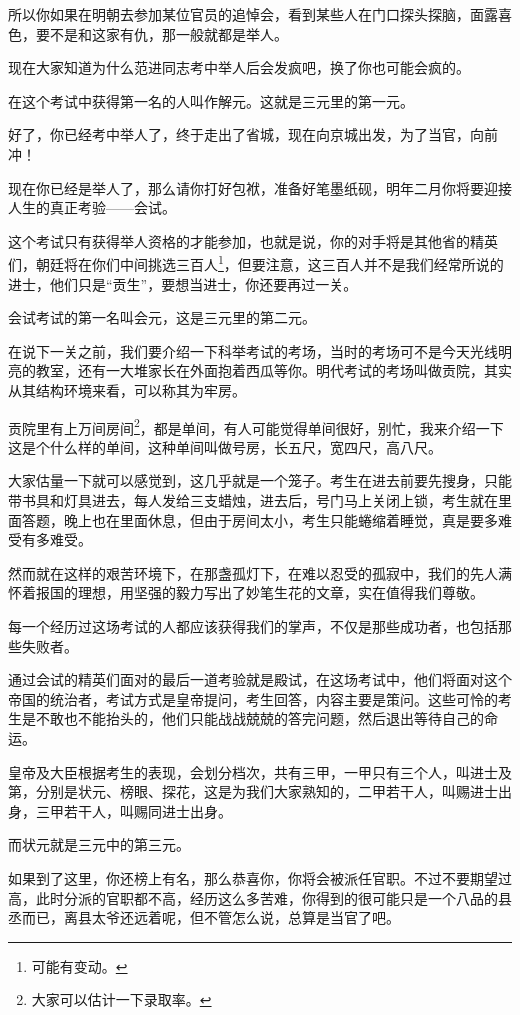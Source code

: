 \begin{multicols}{\theparacolNo}
		所以你如果在明朝去参加某位官员的追悼会，看到某些人在门口探头探脑，面露喜色，要不是和这家有仇，那一般就都是举人。

		现在大家知道为什么范进同志考中举人后会发疯吧，换了你也可能会疯的。

		在这个考试中获得第一名的人叫作解元。这就是三元里的第一元。

		好了，你已经考中举人了，终于走出了省城，现在向京城出发，为了当官，向前冲！

		现在你已经是举人了，那么请你打好包袱，准备好笔墨纸砚，明年二月你将要迎接人生的真正考验——会试。

		这个考试只有获得举人资格的才能参加，也就是说，你的对手将是其他省的精英们，朝廷将在你们中间挑选三百人\footnote{可能有变动。}，但要注意，这三百人并不是我们经常所说的进士，他们只是“贡生”，要想当进士，你还要再过一关。

		会试考试的第一名叫会元，这是三元里的第二元。

		在说下一关之前，我们要介绍一下科举考试的考场，当时的考场可不是今天光线明亮的教室，还有一大堆家长在外面抱着西瓜等你。明代考试的考场叫做贡院，其实从其结构环境来看，可以称其为牢房。

		贡院里有上万间房间\footnote{大家可以估计一下录取率。}，都是单间，有人可能觉得单间很好，别忙，我来介绍一下这是个什么样的单间，这种单间叫做号房，长五尺，宽四尺，高八尺。

		大家估量一下就可以感觉到，这几乎就是一个笼子。考生在进去前要先搜身，只能带书具和灯具进去，每人发给三支蜡烛，进去后，号门马上关闭上锁，考生就在里面答题，晚上也在里面休息，但由于房间太小，考生只能蜷缩着睡觉，真是要多难受有多难受。

		然而就在这样的艰苦环境下，在那盏孤灯下，在难以忍受的孤寂中，我们的先人满怀着报国的理想，用坚强的毅力写出了妙笔生花的文章，实在值得我们尊敬。

		每一个经历过这场考试的人都应该获得我们的掌声，不仅是那些成功者，也包括那些失败者。

		通过会试的精英们面对的最后一道考验就是殿试，在这场考试中，他们将面对这个帝国的统治者，考试方式是皇帝提问，考生回答，内容主要是策问。这些可怜的考生是不敢也不能抬头的，他们只能战战兢兢的答完问题，然后退出等待自己的命运。

		皇帝及大臣根据考生的表现，会划分档次，共有三甲，一甲只有三个人，叫进士及第，分别是状元、榜眼、探花，这是为我们大家熟知的，二甲若干人，叫赐进士出身，三甲若干人，叫赐同进士出身。

		而状元就是三元中的第三元。

		如果到了这里，你还榜上有名，那么恭喜你，你将会被派任官职。不过不要期望过高，此时分派的官职都不高，经历这么多苦难，你得到的很可能只是一个八品的县丞而已，离县太爷还远着呢，但不管怎么说，总算是当官了吧。


\end{multicols}
